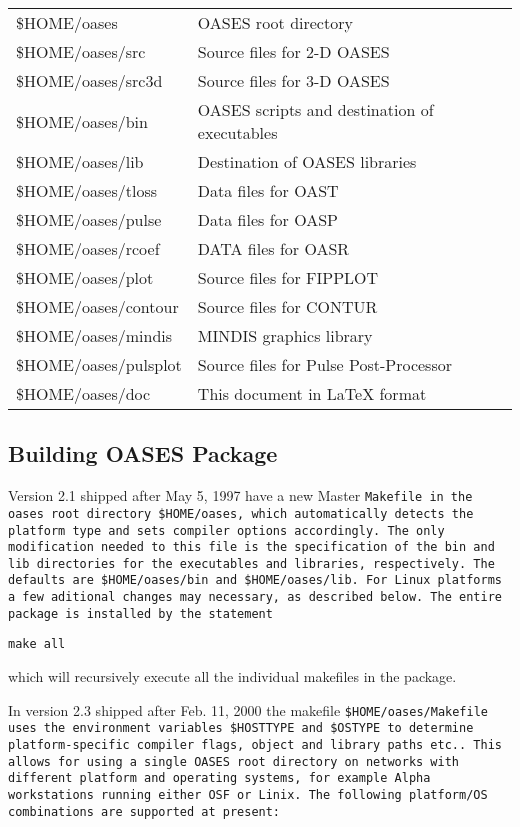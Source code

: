 \begin{tabular}{ll}
\$HOME/oases & OASES root directory \\
\$HOME/oases/src  & Source files for 2-D OASES \\
\$HOME/oases/src3d & Source files for 3-D OASES \\
\$HOME/oases/bin  & OASES scripts and destination of executables \\
\$HOME/oases/lib & Destination of OASES libraries \\
\$HOME/oases/tloss & Data files for OAST \\
\$HOME/oases/pulse & Data files for OASP \\
\$HOME/oases/rcoef & DATA files for OASR \\
\$HOME/oases/plot & Source files for FIPPLOT \\
\$HOME/oases/contour & Source files for CONTUR \\
\$HOME/oases/mindis & MINDIS graphics library \\
\$HOME/oases/pulsplot & Source files for Pulse Post-Processor \\
\$HOME/oases/doc & This document in LaTeX format
\end{tabular}

\subsection{Building OASES Package}

Version 2.1 shipped after May 5, 1997 have a new Master
\tt Makefile \rm in the oases root directory \$HOME/oases, which
automatically detects the platform type and sets compiler options accordingly. The only
modification needed to this file is the specification of the \tt bin
\rm and \tt lib \rm directories for the executables and libraries,
respectively. The defaults are \$HOME/oases/bin and \$HOME/oases/lib.
For Linux platforms a few aditional changes may necessary, 
as described below. The entire package is installed by the statement

\tt make all \rm

\noindent which will recursively execute all the individual makefiles in the
package. 

In version 2.3 shipped after Feb. 11, 2000 the makefile 
\tt \$HOME/oases/Makefile \rm 
uses the environment variables \tt \$HOSTTYPE \rm and \tt \$OSTYPE \rm to
determine platform-specific compiler flags, object and library paths etc.. This allows for using a single OASES root directory on networks with different platform and operating systems,  for example Alpha workstations running either OSF or Linix.
The following platform/OS combinations are supported at present:

